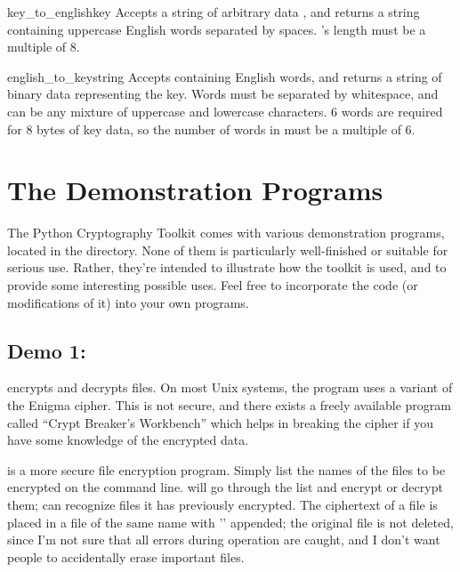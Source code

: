 \documentclass{howto}
\begin{document}
\begin{funcdesc}{key_to_english}{key}
Accepts a string of arbitrary data , and returns a string
containing uppercase English words separated by spaces.  's
length must be a multiple of 8.
\end{funcdesc}

\begin{funcdesc}{english_to_key}{string}
Accepts  containing English words, and returns a string of
binary data representing the key.  Words must be separated by
whitespace, and can be any mixture of uppercase and lowercase
characters.  6 words are required for 8 bytes of key data, so
the number of words in  must be a multiple of 6.
\end{funcdesc}


\section{The Demonstration Programs}

The Python Cryptography Toolkit comes with various demonstration
programs, located in the  directory.  None of them is
particularly well-finished or suitable for serious use.  Rather,
they're intended to illustrate how the toolkit is used, and to provide
some interesting possible uses.  Feel free to incorporate the code (or
modifications of it) into your own programs.

\subsection{Demo 1: }

 encrypts and decrypts files.  On most Unix systems, the
 program uses a variant of the Enigma cipher.  This is not
secure, and there exists a freely available program called ``Crypt
Breaker's Workbench'' which helps in breaking the cipher if you have
some knowledge of the encrypted data.

 is a more secure file encryption program.  Simply list
the names of the files to be encrypted on the command line.
 will go through the list and encrypt or decrypt them;
 can recognize files it has previously encrypted.  The
ciphertext of a file is placed in a file of the same name with
'' appended; the original file is not deleted, since I'm
not sure that all errors during operation are caught, and I don't want
people to accidentally erase important files.
\end{document}
